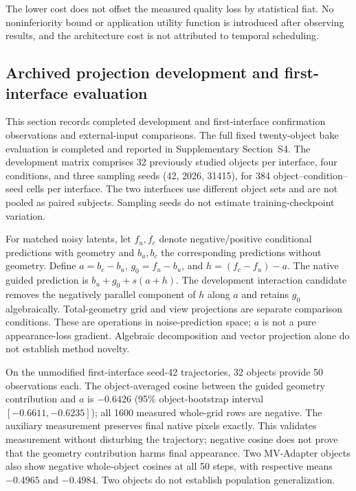 \documentclass[11pt]{article}
\begin{document}
\begin{center}\scriptsize

\end{center}
The lower cost does not offset the measured quality loss by statistical fiat. No noninferiority bound or application utility function is introduced after observing results, and the architecture cost is not attributed to temporal scheduling.

\subsection*{Archived projection development and first-interface evaluation}
This section records completed development and first-interface confirmation
observations and external-input comparisons. The full fixed twenty-object bake evaluation is completed and reported in Supplementary Section~S4. The development matrix comprises 32 previously
studied objects per interface, four conditions, and three sampling seeds
(42, 2026, 31415), for 384 object--condition--seed cells per interface. The two
interfaces use different object sets and are not pooled as paired subjects.
Sampling seeds do not estimate training-checkpoint variation.

For matched noisy latents, let $f_u,f_c$ denote negative/positive conditional
predictions with geometry and $b_u,b_c$ the corresponding predictions without
geometry. Define $a=b_c-b_u$, $g_0=f_u-b_u$, and
$h=(f_c-f_u)-a$. The native guided prediction is $b_u+g_0+s(a+h)$.
The development interaction candidate removes the negatively parallel component
of $h$ along $a$ and retains $g_0$ algebraically. Total-geometry grid and
view projections are separate comparison conditions. These are operations in
noise-prediction space; $a$ is not a pure appearance-loss gradient. Algebraic
decomposition and vector projection alone do not establish method novelty.

On the unmodified first-interface seed-42 trajectories, 32 objects provide
50 observations each. The object-averaged cosine between the guided geometry
contribution and $a$ is $-0.6426$ (95\% object-bootstrap interval
$[-0.6611,-0.6235]$); all 1600 measured whole-grid rows are negative.
The auxiliary measurement preserves final native pixels exactly. This validates
measurement without disturbing the trajectory; negative cosine does not prove
that the geometry contribution harms final appearance. Two MV-Adapter objects
also show negative whole-object cosines at all 50 steps, with respective means
$-0.4965$ and $-0.4984$. Two objects do not establish population generalization.
\end{document}
